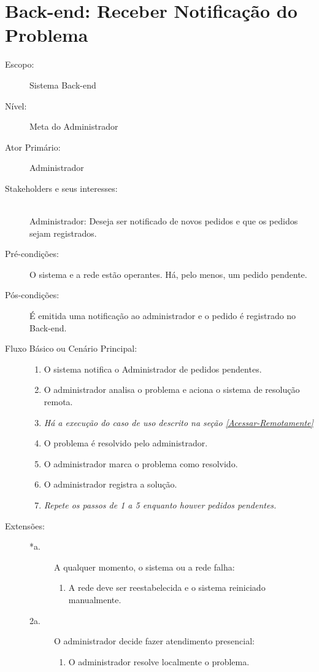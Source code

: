 \documentclass[brazil,times]{abnt}
\begin{document}
\section{Back-end: Receber Notificação do Problema}
\begin{description}
\item[Escopo:] Sistema Back-end
\item[Nível:] Meta do Administrador
\item[Ator Primário:] Administrador
\item[Stakeholders e seus interesses:] \hfill \\
Administrador: Deseja ser notificado de novos pedidos e que os pedidos
sejam registrados.
\item[Pré-condições:] O sistema e a rede estão operantes. Há, pelo menos, um pedido 
pendente.
\item[Pós-condições:]  É emitida uma notificação ao administrador e o pedido é        
registrado no Back-end.
\item[Fluxo Básico ou Cenário Principal:]\hfill
\begin{enumerate}
  \item O sistema notifica o Administrador de pedidos pendentes.
  \item O administrador analisa o problema e aciona o sistema de resolução
  remota.
  \item \emph{Há a execução do caso de uso descrito na seção \ref{Acessar-Remotamente}}
  \item O problema é resolvido pelo administrador.
  \item O administrador marca o problema como resolvido.
  \item O administrador registra a solução.
  \item \emph{Repete os passos de 1 a 5 enquanto houver pedidos pendentes.}
\end{enumerate}

\item[Extensões:]\hfill
\begin{description}
	\item[*a.] A qualquer momento, o sistema ou a rede falha: \hfill
	\begin{enumerate}
 		\item A rede deve ser reestabelecida e o sistema
 		reiniciado manualmente.
	\end{enumerate} 

	\item[2a.] O administrador decide fazer atendimento presencial:
	\begin{enumerate}
  		\item O administrador resolve localmente o problema.
	\end{enumerate}


\end{description}
\end{description}
\end{document}
